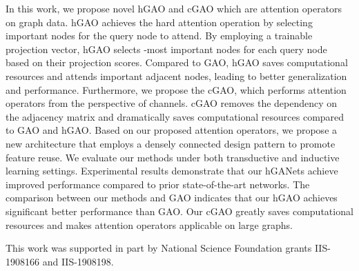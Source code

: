 \documentclass[sigconf]{acmart}
\begin{document}
In this work, we propose novel hGAO and cGAO which are attention
operators on graph data. hGAO achieves the hard attention operation
by selecting important nodes for the query node to attend. By
employing a trainable projection vector, hGAO selects -most
important nodes for each query node based on their projection
scores. Compared to GAO, hGAO saves computational resources and
attends important adjacent nodes, leading to better generalization
and performance. Furthermore, we propose the cGAO, which performs
attention operators from the perspective of channels. cGAO removes
the dependency on the adjacency matrix and dramatically saves
computational resources compared to GAO and hGAO. Based on our
proposed attention operators, we propose a new architecture that
employs a densely connected design pattern to promote feature reuse.
We evaluate our methods under both transductive and inductive
learning settings. Experimental results demonstrate that our hGANets
achieve improved performance compared to prior state-of-the-art
networks. The comparison between our methods and GAO indicates that
our hGAO achieves significant better performance than GAO. Our cGAO
greatly saves computational resources and makes attention operators
applicable on large graphs.

\begin{acks}
This work was supported in part by National Science Foundation grants
IIS-1908166 and IIS-1908198.
\end{acks}



\end{document}
